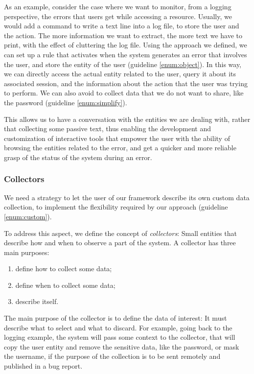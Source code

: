 As an example, consider the case where we want to monitor, from a logging perspective, the errors that users get while accessing a resource.
Usually, we would add a command to write a text line into a log file, to store the user and the action.
The more information we want to extract, the more text we have to print, with the effect of cluttering the log file.
Using the approach we defined, we can set up a rule that activates when the system generates an error that involves the user, and store the entity of the user (guideline \ref{enum:object}).
In this way, we can directly access the actual entity related to the user, query it about its associated session, and the information about the action that the user was trying to perform.
We can also avoid to collect data that we do not want to share, like the password (guideline \ref{enum:simplify}).

This allows us to have a conversation with the entities we are dealing with, rather that collecting some passive text, thus enabling the development and customization of interactive tools that empower the user with the ability of browsing the entities related to the error, and get a quicker and more reliable grasp of the status of the system during an error.


\subsubsection{Collectors}

We need a strategy to let the user of our framework describe its own custom data collection, to implement the flexibility required by our approach (guideline \ref{enum:custom}).

To address this aspect, we define the concept of \emph{collectors}: Small entities that describe how and when to observe a part of the system.
A collector has three main purposes:

\begin{enumerate}
  \item define how to collect some data;
  \item define when to collect some data;
  \item describe itself.
\end{enumerate}

The main purpose of the collector is to define the data of interest: It must describe what to select and what to discard.
For example, going back to the logging example, the system will pass some context to the collector, that will copy the user entity and remove the sensitive data, like the password, or mask the username, if the purpose of the collection is to be sent remotely and published in a bug report.

